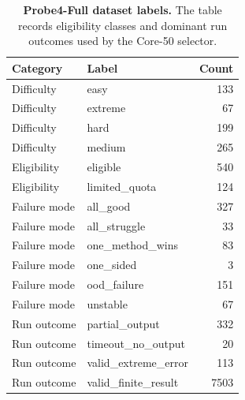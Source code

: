 \begin{table}
\caption{\textbf{Probe4-Full dataset labels.} The table records eligibility classes and dominant run outcomes used by the Core-50 selector.}
\label{tab:table07_probe4_dataset_labels}
\begin{tabular}{llr}
\toprule
\textbf{Category} & \textbf{Label} & \textbf{Count} \\
\midrule
Difficulty & easy & 133 \\
Difficulty & extreme & 67 \\
Difficulty & hard & 199 \\
Difficulty & medium & 265 \\
Eligibility & eligible & 540 \\
Eligibility & limited\_quota & 124 \\
Failure mode & all\_good & 327 \\
Failure mode & all\_struggle & 33 \\
Failure mode & one\_method\_wins & 83 \\
Failure mode & one\_sided & 3 \\
Failure mode & ood\_failure & 151 \\
Failure mode & unstable & 67 \\
Run outcome & partial\_output & 332 \\
Run outcome & timeout\_no\_output & 20 \\
Run outcome & valid\_extreme\_error & 113 \\
Run outcome & valid\_finite\_result & 7503 \\
\bottomrule
\end{tabular}
\end{table}
